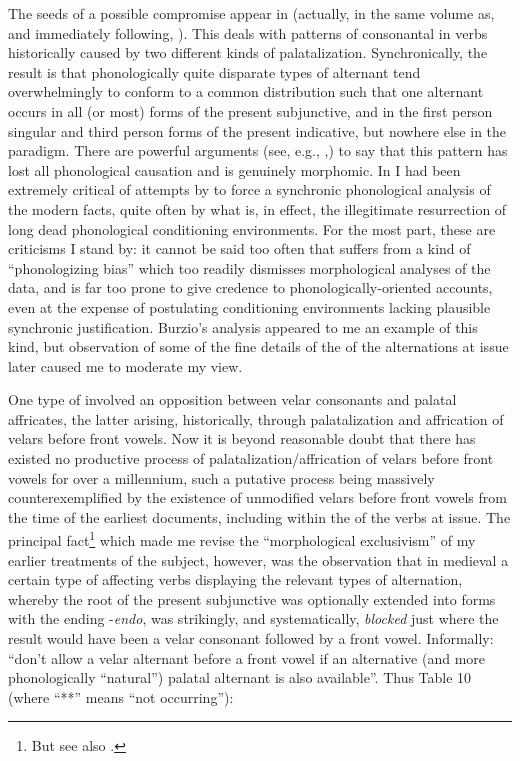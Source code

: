 \documentclass[output=paper,
modfonts
]{LSP/langsci}
\begin{document}
The seeds of a possible compromise appear in \citet{maiden2013a} (actually, in
the same volume as, and immediately following, \citealt{anderson2013stem}). This
deals with patterns of consonantal  in  verbs
historically caused by two different kinds of palatalization.
Synchronically, the result is that phonologically quite disparate types
of alternant tend overwhelmingly to conform to a common distribution
such that one alternant occurs in all (or most) forms of the present
subjunctive, and in the first person singular and third person 
forms of the present indicative, but nowhere else in the paradigm. There
are powerful arguments (see, e.g., \citealt{maiden1992a},\citeyear{maiden2011a}\citeyear[205--63]{maiden2011c}) to
say that this pattern has lost all phonological causation and is
genuinely morphomic. In \citet{maiden2009a} I had been extremely critical of
attempts by \citet{burzio2004a} to force a synchronic phonological analysis of
the modern  facts, quite often by what is, in effect, the
illegitimate resurrection of long dead phonological conditioning
environments. For the most part, these are criticisms I stand by: it
cannot be said too often that  suffers from a kind of
``phonologizing bias'' which too readily dismisses morphological analyses
of the data, and is far too prone to give credence to
phonologically-oriented accounts, even at the expense of postulating
conditioning environments lacking plausible synchronic justification.
Burzio's analysis appeared to me an example of this kind, but
observation of some of the fine details of the  of the
alternations at issue later caused me to moderate my view.

One type of  involved an opposition between velar consonants
and palatal affricates, the latter arising, historically, through
palatalization and affrication of velars before front vowels. Now it is
beyond reasonable doubt that there has existed no productive process of
palatalization/affrication of velars before front vowels for over a
millennium, such a putative process being massively counterexemplified
by the existence of unmodified velars before front vowels from the time
of the earliest documents, including within the  of the verbs at
issue. The principal fact\footnote{But see also \citet[31--35]{maiden2013a}.}
which made me revise \citep{maiden2013a} the ``morphological exclusivism'' of my
earlier treatments of the subject, however, was the observation that in
medieval  a certain type of   affecting verbs
displaying the relevant types of alternation, whereby the root of the
present subjunctive was optionally extended into  forms with the
ending ­-\emph{endo}, was strikingly, and systematically, \emph{blocked}
just where the result would have been a velar consonant followed by a
front vowel. Informally: ``don't allow a velar alternant before a front
vowel if an alternative (and more phonologically ``natural'') palatal
alternant is also available''. Thus Table 10 (where ``**'' means ``not
occurring''):
\end{document}
